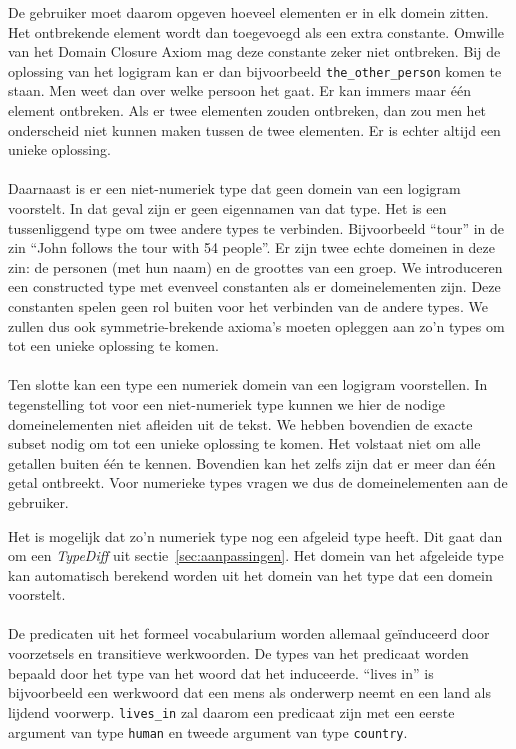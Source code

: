 De gebruiker moet daarom opgeven hoeveel elementen er in elk domein zitten. Het ontbrekende element wordt dan toegevoegd als een extra constante. Omwille van het Domain Closure Axiom mag deze constante zeker niet ontbreken. Bij de oplossing van het logigram kan er dan bijvoorbeeld \texttt{the\_other\_person} komen te staan. Men weet dan over welke persoon het gaat. Er kan immers maar één element ontbreken. Als er twee elementen zouden ontbreken, dan zou men het onderscheid niet kunnen maken tussen de twee elementen. Er is echter altijd een unieke oplossing.

\paragraph{} Daarnaast is er een niet-numeriek type dat geen domein van een logigram voorstelt. In dat geval zijn er geen eigennamen van dat type. Het is een tussenliggend type om twee andere types te verbinden. Bijvoorbeeld ``tour'' in de zin ``John follows the tour with 54 people''. Er zijn twee echte domeinen in deze zin: de personen (met hun naam) en de groottes van een groep. We introduceren een constructed type met evenveel constanten als er domeinelementen zijn. Deze constanten spelen geen rol buiten voor het verbinden van de andere types. We zullen dus ook symmetrie-brekende axioma's moeten opleggen aan zo'n types om tot een unieke oplossing te komen.

\paragraph{} Ten slotte kan een type een numeriek domein van een logigram voorstellen. In tegenstelling tot voor een niet-numeriek type kunnen we hier de nodige domeinelementen niet afleiden uit de tekst. We hebben bovendien de exacte subset nodig om tot een unieke oplossing te komen. Het volstaat niet om alle getallen buiten één te kennen. Bovendien kan het zelfs zijn dat er meer dan één getal ontbreekt. Voor numerieke types vragen we dus de domeinelementen aan de gebruiker.

Het is mogelijk dat zo'n numeriek type nog een afgeleid type heeft. Dit gaat dan om een \textit{TypeDiff} uit sectie~\ref{sec:aanpassingen}. Het domein van het afgeleide type kan automatisch berekend worden uit het domein van het type dat een domein voorstelt.

\paragraph{} De predicaten uit het formeel vocabularium worden allemaal geïnduceerd door voorzetsels en transitieve werkwoorden. De types van het predicaat worden bepaald door het type van het woord dat het induceerde. ``lives in'' is bijvoorbeeld een werkwoord dat een mens als onderwerp neemt en een land als lijdend voorwerp. \texttt{lives\_in} zal daarom een predicaat zijn met een eerste argument van type \texttt{human} en tweede argument van type \texttt{country}.


